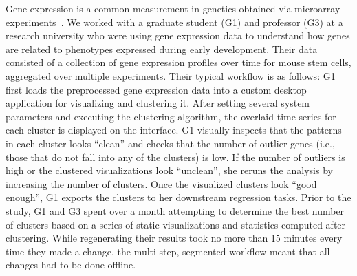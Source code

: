 \par\noindent{} Gene expression is a common measurement in genetics obtained via microarray experiments~\cite{Peng2016}.  We worked with a graduate student (G1) and professor (G3) at a research university who were using gene expression data to understand how genes are related to phenotypes expressed during early development. Their data consisted of a collection of gene expression profiles over time for mouse stem cells, aggregated over multiple experiments. %
\npar Their typical workflow is as follows: G1 first loads the preprocessed gene expression data into a custom desktop application for visualizing and clustering it. After setting several system parameters and executing the clustering algorithm, the overlaid time series for each cluster is displayed on the interface. G1 visually inspects that the patterns in each cluster looks ``clean'' and checks that the number of outlier genes (i.e., those that do not fall into any of the clusters) is low.  If the number of outliers is high or the clustered visualizations look ``unclean'', she reruns the analysis by increasing the number of clusters. Once the visualized clusters look ``good enough'', G1 exports the clusters to her downstream regression tasks.
\npar Prior to the study, G1 and G3 spent over a month attempting to determine the best number of clusters based on a series of static visualizations and statistics computed after clustering. While regenerating their results took no more than 15 minutes every time they made a change, the multi-step, segmented workflow meant that all changes had to be done offline. 
